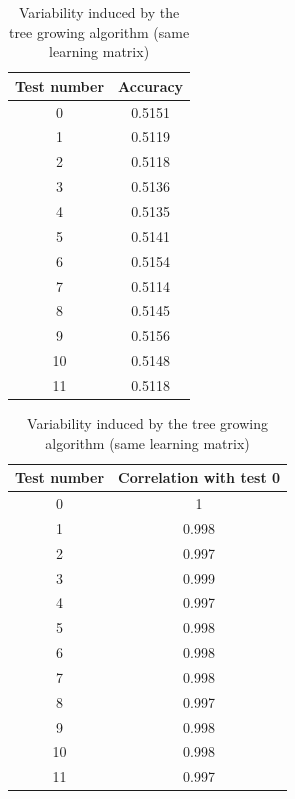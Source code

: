 \documentclass[a4paper]{report}
\begin{document}
				\begin{table}
			\centering
			\begin{subtable}{0.5\textwidth}
				\begin{tabular}{c|c}
				\hline
				Test number & Accuracy \\
				\hline \hline
				0 & 0.5151 \\
				1 & 0.5119 \\
				2 & 0.5118 \\
				3 & 0.5136 \\
				4 & 0.5135 \\
				5 & 0.5141 \\
				6 & 0.5154 \\
				7 & 0.5114 \\
				8 & 0.5145 \\
				9 & 0.5156 \\
				10 & 0.5148 \\
				11 & 0.5118 \\
				\hline
				\end{tabular}
				\caption{\label{tab:AccVarTrees}Accuracy variability}
			\end{subtable}%
			\begin{subtable}{0.5\textwidth}
				\begin{tabular}{c|c}
				\hline
				Test number & Correlation with test 0\\
				\hline \hline
				0 & 1\\
				1 & 0.998 \\
				2 & 0.997 \\
				3 & 0.999 \\
				4 & 0.997 \\
				5 & 0.998 \\
				6 & 0.998 \\
				7 & 0.998 \\
				8 & 0.997 \\
				9 & 0.998 \\
				10 & 0.998 \\
				11 & 0.997 \\
				\hline
				\end{tabular}
				\caption{\label{tab:CorrMatFiltTreeVar}Correlation vector of the filter importances with test number 0}
			\end{subtable}
			\caption{\label{tab:TreeVar}Variability induced by the tree growing algorithm (same learning matrix)}
		\end{table}
		
\end{document}
